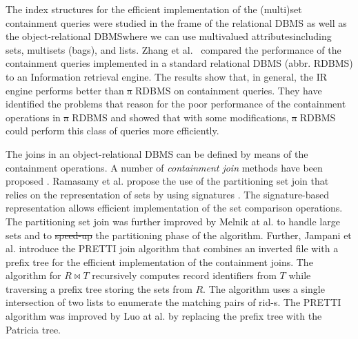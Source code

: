 \documentclass[10pt,letterpaper]{article}
\providecommand{\DIFaddtex}[1]{{\protect\color{blue}\uwave{#1}}} %
\providecommand{\DIFdeltex}[1]{{\protect\color{red}\sout{#1}}}                      %
\providecommand{\DIFaddbegin}{} %
\providecommand{\DIFaddend}{} %
\providecommand{\DIFdelbegin}{} %
\providecommand{\DIFdelend}{} %
\providecommand{\DIFadd}[1]{\texorpdfstring{\DIFaddtex{#1}}{#1}} %
\providecommand{\DIFdel}[1]{\texorpdfstring{\DIFdeltex{#1}}{}} %
\newcommand{\DIFscaledelfig}{0.5}
\newlength{\DIFdelgraphicswidth} %
\newlength{\DIFdelgraphicsheight} %
\newcommand{\DIFaddincludegraphics}[2][]{{\color{blue}\fbox{\DIFOincludegraphics[#1]{#2}}}} %
\newcommand{\DIFdelincludegraphics}[2][]{%
\sbox{\DIFdelgraphicsbox}{\DIFOincludegraphics[#1]{#2}}%
\settoboxwidth{\DIFdelgraphicswidth}{\DIFdelgraphicsbox} %
\settoboxtotalheight{\DIFdelgraphicsheight}{\DIFdelgraphicsbox} %
\scalebox{\DIFscaledelfig}{%
\parbox[b]{\DIFdelgraphicswidth}{\usebox{\DIFdelgraphicsbox}\\[-\baselineskip] \rule{\DIFdelgraphicswidth}{0em}}\llap{\resizebox{\DIFdelgraphicswidth}{\DIFdelgraphicsheight}{%
\setlength{\unitlength}{\DIFdelgraphicswidth}%
\begin{picture}(1,1)%
\thicklines\linethickness{2pt} %
{\color[rgb]{1,0,0}\put(0,0){\framebox(1,1){}}}%
{\color[rgb]{1,0,0}\put(0,0){\line( 1,1){1}}}%
{\color[rgb]{1,0,0}\put(0,1){\line(1,-1){1}}}%
\end{picture}%
}\hspace*{3pt}}} %
} %
\DeclareRobustCommand{\DIFaddbegin}{\DIFOaddbegin \let\includegraphics\DIFaddincludegraphics} %
\DeclareRobustCommand{\DIFaddend}{\DIFOaddend \let\includegraphics\DIFOincludegraphics} %
\DeclareRobustCommand{\DIFdelbegin}{\DIFOdelbegin \let\includegraphics\DIFdelincludegraphics} %
\DeclareRobustCommand{\DIFdelend}{\DIFOaddend \let\includegraphics\DIFOincludegraphics} %
\begin{document}
\DIFdelend The index structures for the efficient implementation of the (multi)set containment queries were studied in the frame of the relational DBMS as well as the object-relational DBMS\DIFaddbegin \DIFadd{, }\DIFaddend where we can use multivalued attributes\DIFaddbegin \DIFadd{, }\DIFaddend including sets, multisets (bags), and lists. Zhang et al.\ \cite{Zhang2001} compared the performance of the containment queries implemented in a standard relational DBMS (abbr. RDBMS) to an Information retrieval engine. The results show that, in general, the IR engine performs better than \DIFdelbegin \DIFdel{a }\DIFdelend \DIFaddbegin \DIFadd{an }\DIFaddend RDBMS on containment queries. They have identified the problems that reason for the poor performance of the containment operations in \DIFdelbegin \DIFdel{a }\DIFdelend \DIFaddbegin \DIFadd{an }\DIFaddend RDBMS and showed that with some modifications, \DIFdelbegin \DIFdel{a }\DIFdelend \DIFaddbegin \DIFadd{an }\DIFaddend RDBMS could perform this class of queries more efficiently. 

The joins in an object-relational DBMS can be defined by means of the containment operations. A number of \emph{containment join} methods have been proposed \cite{Ramasamy2000,Melnik2003,Jampani2005,Luo2015}. Ramasamy et al. propose the use of the partitioning set join that relies on the representation of sets by using signatures \cite{Ramasamy2000}. The signature-based representation allows efficient implementation of the set comparison operations. The partitioning set join was further improved by Melnik at al. \cite{Melnik2003} to handle large sets and to \DIFdelbegin \DIFdel{speed-up }\DIFdelend \DIFaddbegin \DIFadd{speed up }\DIFaddend the partitioning phase of the algorithm. Further, Jampani et al. introduce the PRETTI join algorithm that combines an inverted file with a prefix tree for the efficient implementation of the containment joins. The algorithm for $R\bowtie T$ recursively computes record identifiers from $T$ while traversing a prefix tree storing the sets from $R$. The algorithm uses a single intersection of two lists to enumerate the matching pairs of rid-s. The PRETTI algorithm was improved by Luo at al. \cite{Luo2015} by replacing the prefix tree with the Patricia tree. 

\DIFdelbegin %
\end{document}
